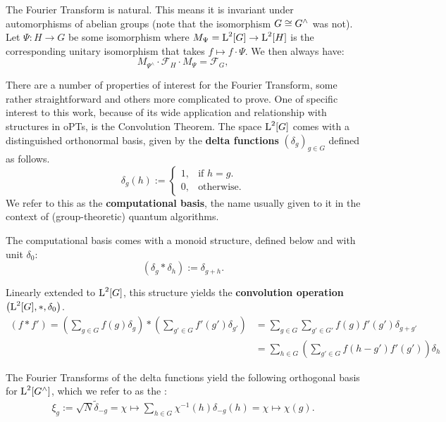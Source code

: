The Fourier Transform is natural.  This means it is invariant under automorphisms of abelian groups (note that the isomorphism $G \cong G^\wedge$ was not). Let $\Psi : H \rightarrow G$ be some isomorphism where $M_\Psi = \operatorname{L}^2[G] \rightarrow \operatorname{L}^2[H]$ is the corresponding unitary isomorphism that takes $f\mapsto f\cdot \Psi$. We then always have:
\begin{equation}\label{eqn:FTcanonicity}
  M_{\Psi^\wedge} \cdot \mathcal{F}_H \cdot M_\Psi =  \mathcal{F}_G,
\end{equation}

There are a number of properties of interest for the Fourier Transform, some rather straightforward and others more complicated to prove. One of specific interest to this work, because of its wide application and relationship with structures in oPTs, is the Convolution Theorem. The space $\operatorname{L}^2[G]$ comes with a distinguished orthonormal basis, given by the \textbf{delta functions} $(\delta_g)_{g\in G}$ defined as follows.
\begin{equation}
\label{eqn:computationalBasis}
  \delta_g(h):=\begin{cases}
    1, & \text{if $h=g$}.\\
    0, & \text{otherwise}.
  \end{cases}
\end{equation}
We refer to this as the \textbf{computational basis}, the name usually given to it in the context of (group-theoretic) quantum algorithms.

The computational basis comes with a monoid structure, defined below and with unit $\delta_0$:
\begin{equation}
  \left(\delta_g*\delta_h\right):=\delta_{g+h}.
\end{equation}

Linearly extended to $\operatorname{L}^2[G]$, this structure yields the \textbf{convolution operation} $\left( \operatorname{L}^2[G],*,\delta_0 \right)$.
\begin{align}
\label{eqn:convolutionOperation}
\left(f * f'\right) = \left(\sum_{g\in G} f(g) \delta_g \right) * \left( \sum_{g' \in  G} f'(g') \delta_{g'} \right) &= \sum_{g\in G} \sum_{g'\in G'} f(g) f'(g') \delta_{g+g'} \\ 
&= \sum_{h\in G} \left(\sum_{g'\in G} f(h-g') f'(g')\right) \delta_h
\end{align}

The Fourier Transforms of the delta functions yield the following orthogonal basis for $\operatorname{L}^2[G^\wedge]$, which we refer to as the :
\begin{align*}
\xi_{g} := \sqrt{N}\tilde{\delta}_{-g} = \chi \mapsto \sum_{h \in G}\chi^{-1}(h)\delta_{-g}(h) = \chi \mapsto \chi(g).
\end{align*}

